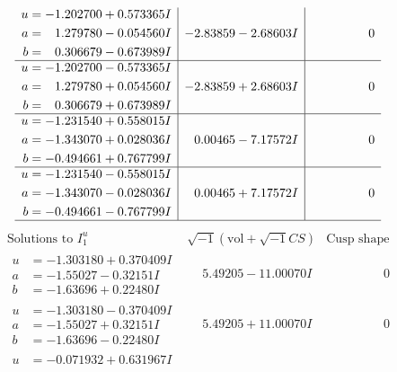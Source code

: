 \documentclass[1p]{elsarticle_modified}
\theoremstyle{definition}
\newcommand{\I}{\sqrt{-1}}
\begin{document}
$$\begin{array}{c|c|c}
\begin{aligned}
u &= -1.202700 + 0.573365 I \\
a &= \phantom{-}1.279780 - 0.054560 I \\
b &= \phantom{-}0.306679 - 0.673989 I\end{aligned}
 & -2.83859 - 2.68603 I & \phantom{-0.000000 } 0 \\ \hline\begin{aligned}
u &= -1.202700 - 0.573365 I \\
a &= \phantom{-}1.279780 + 0.054560 I \\
b &= \phantom{-}0.306679 + 0.673989 I\end{aligned}
 & -2.83859 + 2.68603 I & \phantom{-0.000000 } 0 \\ \hline\begin{aligned}
u &= -1.231540 + 0.558015 I \\
a &= -1.343070 + 0.028036 I \\
b &= -0.494661 + 0.767799 I\end{aligned}
 & \phantom{-}0.00465 - 7.17572 I & \phantom{-0.000000 } 0 \\ \hline\begin{aligned}
u &= -1.231540 - 0.558015 I \\
a &= -1.343070 - 0.028036 I \\
b &= -0.494661 - 0.767799 I\end{aligned}
 & \phantom{-}0.00465 + 7.17572 I & \phantom{-0.000000 } 0\\
 \hline 
 \end{array}$$\newpage$$\begin{array}{c|c|c}  
\text{Solutions to }I^u_{1}& \I (\text{vol} + \sqrt{-1}CS) & \text{Cusp shape}\\
 \hline 
\begin{aligned}
u &= -1.303180 + 0.370409 I \\
a &= -1.55027 - 0.32151 I \\
b &= -1.63696 + 0.22480 I\end{aligned}
 & \phantom{-}5.49205 - 11.00070 I & \phantom{-0.000000 } 0 \\ \hline\begin{aligned}
u &= -1.303180 - 0.370409 I \\
a &= -1.55027 + 0.32151 I \\
b &= -1.63696 - 0.22480 I\end{aligned}
 & \phantom{-}5.49205 + 11.00070 I & \phantom{-0.000000 } 0 \\ \hline\begin{aligned}
u &= -0.071932 + 0.631967 I \\

\end{aligned}
\end{array}$$
\end{document}
